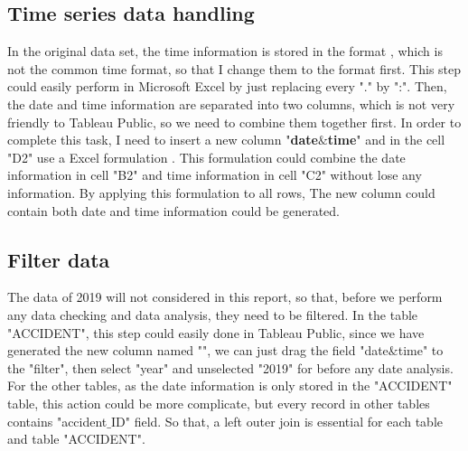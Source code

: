 \documentclass[11pt]{article}
\theoremstyle{definition}
\begin{document}
\subsection{Time series data handling}
In the original data set, the time information is stored in the format , which is not the common time format, so that I change them to the format  first. This step could easily perform in Microsoft Excel by just replacing every "." by ":". Then, the date and time information are separated into two columns, which is not very friendly to Tableau Public, so we need to combine them together first. In order to complete this task, I need to insert a new column "\textbf{date$\&$time}" and in the cell "D2" use a Excel formulation . This formulation could combine the date information in cell "B2" and time information in cell "C2" without lose any information. By applying this formulation to all rows, The new column could contain both date and time information could be generated.

\subsection{Filter data}	
The data of 2019 will not considered in this report, so that, before we perform any data checking and data analysis, they need to be filtered. In the table "ACCIDENT", this step could easily done in Tableau Public, since we have generated the new column named "", we can just drag the field "date$\&$time" to the "filter", then select "year" and unselected "2019" for before any date analysis. For the other tables, as the date information is only stored in the "ACCIDENT" table, this action could be more complicate, but every record in other tables contains "accident$\_$ID" field. So that, a left outer join is essential for each table and table "ACCIDENT". 
\end{document}

